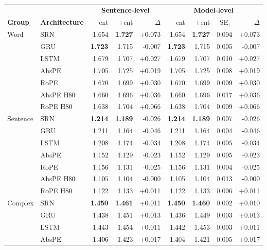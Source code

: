 \begin{table}[t]
\centering\scriptsize
\begin{tabular}{@{}llrrrrrrr@{}}
\toprule
 &  & \multicolumn{3}{c}{\textbf{Sentence-level}} & \multicolumn{4}{c}{\textbf{Model-level}} \\
\cmidrule(lr){3-5} \cmidrule(lr){6-9}
\textbf{Group} & \textbf{Architecture} & $-$ent & $+$ent & $\Delta$ & $-$ent & $+$ent & SE$_{+}$ & $\Delta$ \\
\midrule
Word & SRN & 1.654 & \textbf{1.727} & +0.073 & 1.654 & \textbf{1.727} & 0.004 & +0.073 \\
 & GRU & \textbf{1.723} & 1.715 & -0.007 & \textbf{1.723} & 1.715 & 0.005 & -0.007 \\
 & LSTM & 1.679 & 1.707 & +0.027 & 1.679 & 1.707 & 0.010 & +0.027 \\
 & AbsPE & 1.705 & 1.725 & +0.019 & 1.705 & 1.725 & 0.008 & +0.019 \\
 & RoPE & 1.670 & 1.699 & +0.030 & 1.670 & 1.699 & 0.009 & +0.030 \\
 & AbsPE H80 & 1.660 & 1.696 & +0.036 & 1.660 & 1.696 & 0.017 & +0.036 \\
 & RoPE H80 & 1.638 & 1.704 & +0.066 & 1.638 & 1.704 & 0.009 & +0.066 \\
\addlinespace
Sentence & SRN & \textbf{1.214} & \textbf{1.189} & -0.026 & \textbf{1.214} & \textbf{1.189} & 0.007 & -0.026 \\
 & GRU & 1.211 & 1.164 & -0.046 & 1.211 & 1.164 & 0.004 & -0.046 \\
 & LSTM & 1.208 & 1.174 & -0.034 & 1.208 & 1.174 & 0.005 & -0.034 \\
 & AbsPE & 1.152 & 1.129 & -0.023 & 1.152 & 1.129 & 0.005 & -0.023 \\
 & RoPE & 1.156 & 1.131 & -0.025 & 1.156 & 1.131 & 0.004 & -0.025 \\
 & AbsPE H80 & 1.105 & 1.104 & -0.000 & 1.105 & 1.104 & 0.013 & -0.000 \\
 & RoPE H80 & 1.122 & 1.133 & +0.011 & 1.122 & 1.133 & 0.006 & +0.011 \\
\addlinespace
Complex & SRN & \textbf{1.450} & \textbf{1.461} & +0.011 & \textbf{1.450} & \textbf{1.460} & 0.002 & +0.010 \\
 & GRU & 1.438 & 1.451 & +0.013 & 1.436 & 1.449 & 0.003 & +0.013 \\
 & LSTM & 1.443 & 1.454 & +0.011 & 1.442 & 1.453 & 0.003 & +0.011 \\
 & AbsPE & 1.406 & 1.423 & +0.017 & 1.404 & 1.421 & 0.005 & +0.017 \\

\end{tabular}
\end{table}
